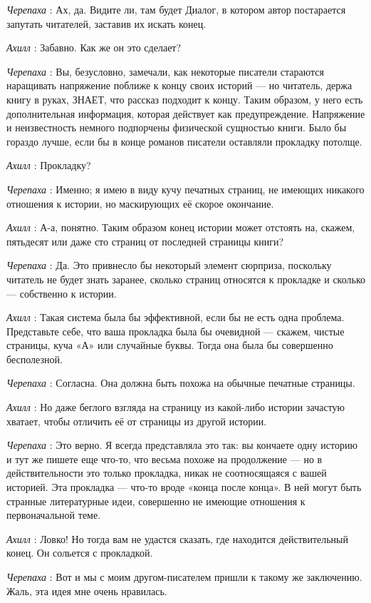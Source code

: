 \documentclass[../main.tex]{subfiles}
\begin{document}
\begin{dialogue}
\emph{Черепаха} : Ах, да. Видите ли, там будет Диалог, в котором автор постарается запутать читателей, заставив их искать конец.

\emph{Ахилл} : Забавно. Как же он это сделает?

\emph{Черепаха} : Вы, безусловно, замечали, как некоторые писатели стараются наращивать напряжение поближе к концу своих историй --- но читатель, держа книгу в руках, ЗНАЕТ, что рассказ подходит к концу. Таким образом, у него есть дополнительная информация, которая действует как предупреждение. Напряжение и неизвестность немного подпорчены физической сущностью книги. Было бы гораздо лучше, если бы в конце романов писатели оставляли прокладку потолще.

\emph{Ахилл} : Прокладку?

\emph{Черепаха} : Именно; я имею в виду кучу печатных страниц, не имеющих никакого отношения к истории, но маскирующих её скорое окончание.

\emph{Ахилл} : А-а, понятно. Таким образом конец истории может отстоять на, скажем, пятьдесят или даже сто страниц от последней страницы книги?

\emph{Черепаха} : Да. Это привнесло бы некоторый элемент сюрприза, поскольку читатель не будет знать заранее, сколько страниц относятся к прокладке и сколько --- собственно к истории.

\emph{Ахилл} : Такая система была бы эффективной, если бы не есть одна проблема. Представьте себе, что ваша прокладка была бы очевидной --- скажем, чистые страницы, куча «А» или случайные буквы. Тогда она была бы совершенно бесполезной.

\emph{Черепаха} : Согласна. Она должна быть похожа на обычные печатные страницы.

\emph{Ахилл} : Но даже беглого взгляда на страницу из какой-либо истории зачастую хватает, чтобы отличить её от страницы из другой истории.

\emph{Черепаха} : Это верно. Я всегда представляла это так: вы кончаете одну историю и тут же пишете еще что-то, что весьма похоже на продолжение --- но в действительности это только прокладка, никак не соотносящаяся с вашей историей. Эта прокладка --- что-то вроде «конца после конца». В ней могут быть странные литературные идеи, совершенно не имеющие отношения к первоначальной теме.

\emph{Ахилл} : Ловко! Но тогда вам не удастся сказать, где находится действительный конец. Он сольется с прокладкой.

\emph{Черепаха} : Вот и мы с моим другом-писателем пришли к такому же заключению. Жаль, эта идея мне очень нравилась.


\end{dialogue}
\end{document}
